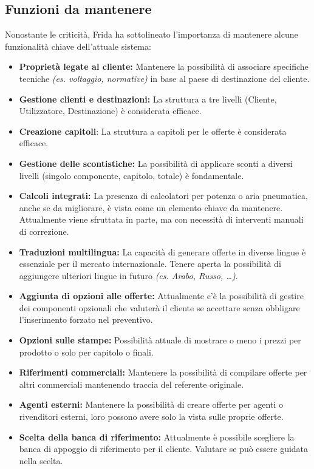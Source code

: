 \documentclass[12pt, a4paper]{article} %
\begin{document}
\subsection{Funzioni da mantenere}
Nonostante le criticità, Frida ha sottolineato l'importanza di mantenere alcune
funzionalità chiave dell'attuale sistema:
\begin{itemize}
      \item \textbf{Proprietà legate al cliente:} Mantenere la possibilità di associare specifiche tecniche \textit{(es. voltaggio, normative)}
            in base al paese di destinazione del cliente.
      \item \textbf{Gestione clienti e destinazioni:} La struttura a tre livelli (Cliente, Utilizzatore, Destinazione) è considerata efficace.
      \item \textbf{Creazione capitoli}: La struttura a capitoli per le offerte è considerata efficace.
      \item \textbf{Gestione delle scontistiche:} La possibilità di applicare sconti a diversi livelli (singolo componente, capitolo, totale) è fondamentale.
      \item \textbf{Calcoli integrati:} La presenza di calcolatori per potenza o aria pneumatica, anche se da migliorare, è vista come un elemento chiave da mantenere.
            Attualmente viene sfruttata in parte, ma con necessità di interventi manuali di correzione.
      \item \textbf{Traduzioni multilingua:} La capacità di generare offerte in diverse lingue è essenziale per il mercato internazionale.
            Tenere aperta la possibilità di aggiungere ulteriori lingue in futuro \textit{(es. Arabo, Russo, \dots)}.
      \item \textbf{Aggiunta di opzioni alle offerte:} Attualmente c'è la possibilità di gestire dei componenti opzionali che valuterà il cliente
            se accettare senza obbligare l'inserimento forzato nel preventivo.
      \item \textbf{Opzioni sulle stampe:} Possibilità attuale di mostrare o meno i prezzi per prodotto o solo per capitolo o finali.
      \item \textbf{Riferimenti commerciali:} Mantenere la possibilità di compilare offerte per altri commerciali mantenendo traccia del referente originale.
      \item \textbf{Agenti esterni:} Mantenere la possibilità di creare offerte per agenti o rivenditori esterni, loro possono avere solo la vista sulle proprie offerte.
      \item \textbf{Scelta della banca di riferimento:} Attualmente è possibile scegliere la banca di appoggio di riferimento per il cliente. Valutare se può essere guidata nella scelta.

\end{itemize}
\end{document}

